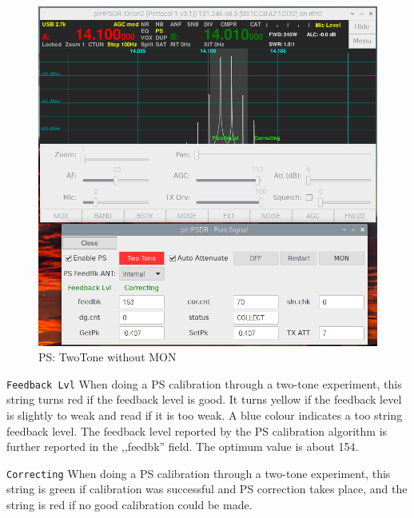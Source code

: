 \documentclass[12pt]{book}
\def\rett#1{\texttt{\color{red}#1}}
\begin{document}
\begin{figure}[ht]
\center
\includegraphics[width=12cm]{PSnomon.png}
\caption{PS: TwoTone without MON}
\label{fig:PSnomon}
\end{figure}

\rett{Feedback Lvl} When doing a PS calibration through a two-tone experiment, this string
turns red if the feedback level is good. It turns yellow if the feedback level is slightly
to weak and read if it is too weak. A blue colour indicates a too string feedback level.
The feedback level reported by the PS calibration algorithm is further reported in the
,,feedbk'' field. The optimum value is about 154.

\rett{Correcting} When doing a PS calibration through a two-tone experiment, this string
is green if calibration was successful and PS correction takes place, and the string is
red if no good calibration could be made.
\end{document}
